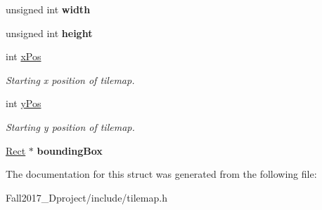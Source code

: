 \begin{DoxyCompactItemize}
unsigned int {\bfseries width}
\item 
\mbox{\label{structtilemap__s_a702a9de3fb721fd60e3f1b1ba47cb2ac}} 
unsigned int {\bfseries height}
\item 
\mbox{\label{structtilemap__s_a89bc94696823ec65bc39ea2d80852b4b}} 
int \hyperlink{structtilemap__s_a89bc94696823ec65bc39ea2d80852b4b}{x\+Pos}
\begin{DoxyCompactList}\small\item\em Starting x position of tilemap. \end{DoxyCompactList}\item 
\mbox{\label{structtilemap__s_aef66c815fb97b3987bfb05ffb1f3b917}} 
int \hyperlink{structtilemap__s_aef66c815fb97b3987bfb05ffb1f3b917}{y\+Pos}
\begin{DoxyCompactList}\small\item\em Starting y position of tilemap. \end{DoxyCompactList}\item 
\mbox{\label{structtilemap__s_ae4938ae81f87ead93de9be6127ffe55f}} 
\hyperlink{structrect__s}{Rect} $\ast$ {\bfseries bounding\+Box}
\end{DoxyCompactItemize}


The documentation for this struct was generated from the following file\+:\begin{DoxyCompactItemize}
\item 
Fall2017\+\_\+Dproject/include/tilemap.\+h\end{DoxyCompactItemize}
